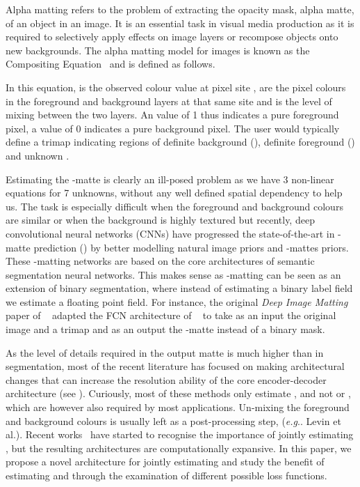 \documentclass[runningheads]{llncs}
\makeatletter
\DeclareRobustCommand\onedot{\futurelet\@let@token\@onedot}
\def\@onedot{\ifx\@let@token.\else.\null\fi\xspace}
\def\eg{\emph{e.g}\onedot} \def\Eg{\emph{E.g}\onedot}
\makeatother
\begin{document}
Alpha matting refers to the problem of extracting the opacity mask, alpha matte,
of an object in an image. It is an essential task in visual media production as
it is required to selectively apply effects on image layers or recompose objects
onto new backgrounds. The alpha matting model for images is known as the
Compositing Equation~\cite{brinkman_compositing} and is defined as follows.

In this equation,  is the observed colour value at pixel site ,
 are the pixel colours in the foreground and background layers at
that same site and  is the level of mixing between the two
layers. An  value of 1 thus indicates a pure foreground pixel, a value
of 0 indicates a pure background pixel. The user would typically define a trimap
indicating regions of definite background (), definite foreground
() and unknown .

Estimating the -matte is clearly an ill-posed problem as we have 3
non-linear equations for 7 unknowns, without any well defined spatial dependency
to help us. The task is especially difficult when the foreground and background
colours are similar or when the background is highly textured but recently, deep
convolutional neural networks (CNNs) have progressed the state-of-the-art in
-matte prediction (\cite{DeepImageMatting,AlphaGAN,LearningBasedSamplingMatting,ContextMatting}) by better modelling natural image priors
and -mattes priors. These -matting networks are based on the
core architectures of semantic segmentation neural networks. This makes sense as
-matting can be seen as an extension of binary segmentation, where
instead of estimating a binary  label field we estimate a floating
point  field. For instance, the original \textit{Deep Image
  Matting} paper of ~\cite{DeepImageMatting} adapted the FCN architecture of
~\cite{FCN} to take as an input the original image and a trimap and as an output
the -matte instead of a binary mask.

As the level of details required in the output matte is much higher than in
segmentation, most of the recent literature has focused on making
architectural changes that can increase the resolution ability of the core
encoder-decoder architecture (see \cite{DeepImageMatting,IndexMatting,VDRNMatting,ContextMatting}). Curiously, most of these methods
only estimate , and not  or , which are however also required by
most applications. Un-mixing the foreground and background colours is usually
left as a post-processing step, (\eg Levin et al.\cite{ClosedFormMattingPAMI}). Recent works~\cite{ContextMatting,LearningBasedSamplingMatting}
have started to recognise the importance of jointly estimating ,
but the resulting architectures are computationally expansive. In this paper, we
propose a novel architecture for jointly estimating  and
 study the benefit of  estimating  and  through the
examination of different possible loss functions.
\end{document}
